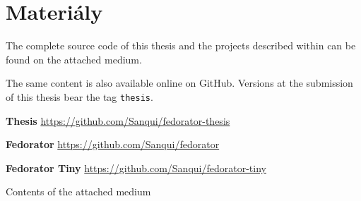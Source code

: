 \chapter{Materiály}


The complete source code of this thesis and the projects described within can be found on the attached medium.  

The same content is also available online on GitHub.  Versions at the submission of this thesis bear the tag \texttt{thesis}.

\noindent \textbf{Thesis} \hfill
    \url{https://github.com/Sanqui/fedorator-thesis}

\noindent \textbf{Fedorator} \hfill
    \url{https://github.com/Sanqui/fedorator}
    
\noindent \textbf{Fedorator Tiny} \hfill
    \url{https://github.com/Sanqui/fedorator-tiny}

\vfill

\begin{dirfigure}%
\caption{Contents of the attached medium}
\end{dirfigure}
